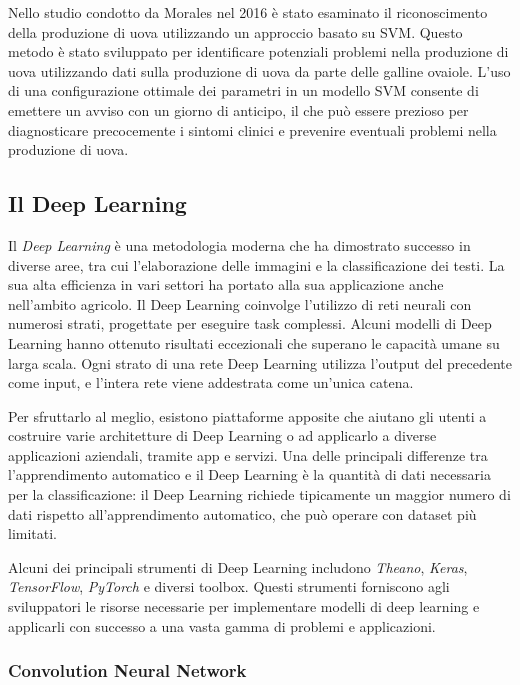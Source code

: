 Nello studio condotto da Morales nel 2016 è stato esaminato il riconoscimento della produzione di uova utilizzando un approccio basato su SVM. Questo metodo è stato sviluppato per identificare potenziali problemi nella produzione di uova utilizzando dati sulla produzione di uova da parte delle galline ovaiole. L'uso di una configurazione ottimale dei parametri in un modello SVM consente di emettere un avviso con un giorno di anticipo, il che può essere prezioso per diagnosticare precocemente i sintomi clinici e prevenire eventuali problemi nella produzione di uova.

\subsection{Il Deep Learning}

Il \textit{Deep Learning} è una metodologia moderna che ha dimostrato successo in diverse aree, tra cui l'elaborazione delle immagini e la classificazione dei testi. La sua alta efficienza in vari settori ha portato alla sua applicazione anche nell'ambito agricolo. Il Deep Learning coinvolge l'utilizzo di reti neurali con numerosi strati, progettate per eseguire task complessi. Alcuni modelli di Deep Learning hanno ottenuto risultati eccezionali che superano le capacità umane su larga scala. Ogni strato di una rete Deep Learning utilizza l'output del precedente come input, e l'intera rete viene addestrata come un'unica catena.

Per sfruttarlo al meglio, esistono piattaforme apposite che aiutano gli utenti a costruire varie architetture di Deep Learning o ad applicarlo a diverse applicazioni aziendali, tramite app e servizi. Una delle principali differenze tra l'apprendimento automatico e il Deep Learning è la quantità di dati necessaria per la classificazione: il Deep Learning richiede tipicamente un maggior numero di dati rispetto all'apprendimento automatico, che può operare con dataset più limitati.

Alcuni dei principali strumenti di Deep Learning includono \textit{Theano}, \textit{Keras}, \textit{TensorFlow}, \textit{PyTorch} e diversi toolbox. Questi strumenti forniscono agli sviluppatori le risorse necessarie per implementare modelli di deep learning e applicarli con successo a una vasta gamma di problemi e applicazioni.

\subsubsection{Convolution Neural Network}

